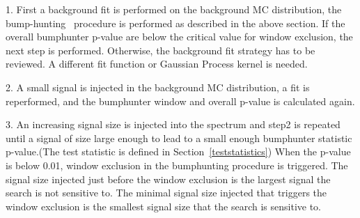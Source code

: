    1. First a background fit is performed on the background MC distribution, the bump-hunting~\cite{choudalakis2011hypothesis} procedure is performed as described in the above section. If the overall bumphunter p-value are below the critical value for window exclusion, the next step is performed. Otherwise, the background fit strategy has to be reviewed. A different fit function or Gaussian Process kernel is needed.

   2. A small signal is injected in the background MC distribution, a fit is reperformed, and the bumphunter window and overall p-value is calculated again. 

   3. An increasing signal size is injected into the spectrum and step2 is repeated until a signal of size large enough to lead to a small enough bumphunter statistic p-value.(The test statistic is defined in Section~\ref{teststatistics}) When the p-value is below 0.01, window exclusion in the bumphunting procedure is triggered. The signal size injected just before the window exclusion is the largest signal the search is not sensitive to. The minimal signal size injected that triggers the window exclusion is the smallest signal size that the search is sensitive to. 


%

   
